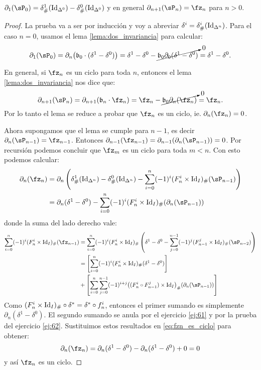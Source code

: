 \documentclass[../../topologia_algebraica]{subfiles}
\begin{document}
\begin{lema}\label{lema:calculo_frontera_sP}
  $\partial_1(\sP_0)=\delta^1_{\#}(\Id_{\Delta^0})-\delta^0_{\#}(\Id_{\Delta^0})$ y
  en general $\partial_{n+1}(\sP_n)=\fz_n$ para $n>0$.
\end{lema}
\begin{proof}
  La prueba va a ser por inducci\'on y voy a abreviar $\delta^i=\delta^i_{\#}(\text{Id}_{\Delta^n})$.
  Para el caso $n=0$, usamos el lema \ref{lema:dos_invariancia} para calcular:
  \[
    \partial_1(\sP_0)=\partial_n\big(\fb_0\cdot(\delta^1-\delta^0)\big)=
    \delta^1-\delta^0-\cancelto{0}{\fb_0\partial_0(\delta^1-\delta^0)}=\delta^1-\delta^0.
  \]

  En general, si $\fz_n$ es un ciclo para toda $n$, entonces el lema \ref{lema:dos_invariancia}
  nos dice que:
  \[
    \partial_{n+1}(\sP_n)=\partial_{n+1}(\fb_n\cdot\fz_n)=
    \fz_n-\cancelto{0}{\fb_0\partial_n(\fz_n)}=\fz_n.
  \]
  Por lo tanto el lema se reduce a probar que $\fz_n$ es un ciclo, ie. $\partial_n(\fz_n)=0$.

  Ahora supongamos que el lema se cumple para $n-1$, es decir $\partial_n(\sP_{n-1})=\fz_{n-1}$.
  Entonces $\partial_{n-1}(\fz_{n-1})=\partial_{n-1}(\partial_n(\sP_{n-1}))=0$. Por recursi\'on
  podemos concluir que $\fz_m$ es un ciclo para toda $m<n$. Con esto podemos calcular:
  \begin{align*}
    \partial_n(\fz_n)& =\partial_n\paren{\delta^1_{\#}(\Id_{\Delta^n})-\delta^0_{\#}(\Id_{\Delta^n})-
    \sum_{i=0}^n(-1)^i(F^i_n\times\Id_I)_{\#}(\sP_{n-1})} \\ & =
    \partial_n(\delta^1-\delta^0)-\sum_{i=0}^n(-1)^i(F^i_n\times\Id_I)_{\#}(\partial_n(\sP_{n-1}))
  \end{align*}
  donde la suma del lado derecho vale:
  \begin{align*}
  \sum_{i=0}^n(-1)^i(F^i_n\times\Id_I)_{\#}(\fz_{n-1}) & =
  \sum_{i=0}^n(-1)^i(F^i_n\times\Id_I)_{\#}\paren{%
    \delta^1-\delta^0-\sum_{j=0}^{n-1}(-1)^j(F^j_{n-1}\times\Id_I)_{\#}(\sP_{n-2})} \\ & =
  \left[ \sum_{i=0}^n(-1)^i(F^i_n\times\Id_I)_{\#}(\delta^1-\delta^0) \right]\\ & +
  \left[\sum_{i=0}^n\sum_{j=0}^{n-1}(-1)^{i+j}\big((F^i_n\circ F_{n-1}^j)\times\Id_I\big)_{\#}%
    (\partial_n(\sP_{n-1}))\right]
  \end{align*}
  Como $(F^i_n\times\text{Id}_I)_{\#}\circ\delta^{*}=\delta^{*}\circ f_n^i$, entonces el primer
  sumando es simplemente $\partial_n(\delta^1-\delta^0)$. El segundo sumando se anula
  por el ejercicio \ref{ej:61} y por la prueba del ejercicio \ref{ej:62}. Sustituimos
  estos resultados en \ref{eq:fzn_es_ciclo} para obtener:
  \[
    \partial_n(\fz_n)=\partial_n(\delta^1-\delta^0)-\partial_n(\delta^1-\delta^0)+0=0
  \]
  y as\'i $\fz_n$ es un ciclo.
\end{proof}
\end{document}

